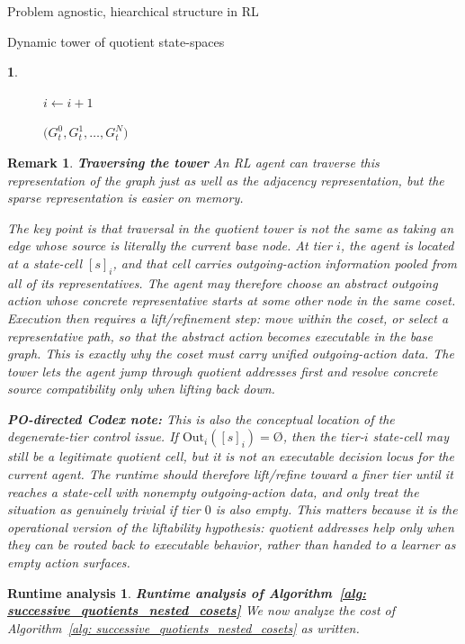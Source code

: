 \documentclass[11pt]{article}
\newtheorem{remark}[subsubsection]{Remark}
\newtheorem{ermark}[subsubsection]{}
\newtheorem{run_analysis}[subsubsection]{Runtime analysis}
\begin{document}
\begin{section}{Problem agnostic, hiearchical structure in RL}
\begin{subsection}{Dynamic tower of quotient state-spaces}
\begin{ermark}
\begin{figure}[!h]
\begin{algorithm}[H]
\begin{algorithmic}[1]
        \State $i \gets i+1$

    \EndWhile

    \State \Return $\bigl(
    G_t^0,G_t^1,\dots,G_t^N
    \bigr)$
\EndFunction

\end{algorithmic}
\end{algorithm}
    \label{fig: algorithm 1}
\end{figure}

\end{ermark}

\begin{remark}
{\bf Traversing the tower}
\normalfont
An RL agent can traverse this representation of the graph just as well as the adjacency representation, but the sparse representation is easier on memory.

The key point is that traversal in the quotient tower is not the same as taking an edge whose source is literally the current base node. At tier $i$, the agent is located at a state-cell $[s]_i$, and that cell carries outgoing-action information pooled from all of its representatives. The agent may therefore choose an abstract outgoing action whose concrete representative starts at some other node in the same coset. Execution then requires a lift/refinement step: move within the coset, or select a representative path, so that the abstract action becomes executable in the base graph. This is exactly why the coset must carry unified outgoing-action data. The tower lets the agent jump through quotient addresses first and resolve concrete source compatibility only when lifting back down.

{\color{violet} \textbf{PO-directed Codex note:} This is also the conceptual location of the degenerate-tier control issue. If $\mathrm{Out}_i([s]_i)=\text{\O}$, then the tier-$i$ state-cell may still be a legitimate quotient cell, but it is not an executable decision locus for the current agent. The runtime should therefore lift/refine toward a finer tier until it reaches a state-cell with nonempty outgoing-action data, and only treat the situation as genuinely trivial if tier $0$ is also empty. This matters because it is the operational version of the liftability hypothesis: quotient addresses help only when they can be routed back to executable behavior, rather than handed to a learner as empty action surfaces.}
\end{remark}

\begin{run_analysis}
{\bf Runtime analysis of Algorithm~\ref{alg: successive_quotients_nested_cosets}}
\normalfont
We now analyze the cost of Algorithm~\ref{alg: successive_quotients_nested_cosets} as written.


\end{run_analysis}
\end{subsection}
\end{section}
\end{document}
